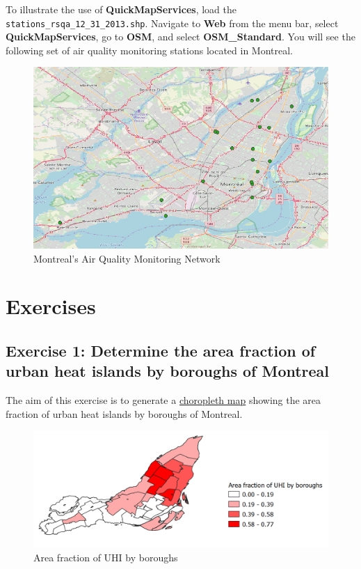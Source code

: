 \documentclass[]{book}
\theoremstyle{definition}
\theoremstyle{definition}
\theoremstyle{definition}
\theoremstyle{remark}
\begin{document}
To illustrate the use of \textbf{QuickMapServices}, load the
\texttt{stations\_rsqa\_12\_31\_2013.shp}. Navigate to \textbf{Web} from
the menu bar, select \textbf{QuickMapServices}, go to \textbf{OSM}, and
select \textbf{OSM\_Standard}. You will see the following set of air
quality monitoring stations located in Montreal.

\begin{figure}

{\centering \includegraphics[width=11.42in]{figures/BaseMaps_Example} 

}

\caption{Montreal's Air Quality Monitoring Network}\label{fig:unnamed-chunk-25}
\end{figure}

\chapter{Exercises}\label{exercises}

\section{Exercise 1: Determine the area fraction of urban heat islands
by boroughs of
Montreal}\label{exercise-1-determine-the-area-fraction-of-urban-heat-islands-by-boroughs-of-montreal}

The aim of this exercise is to generate a
\href{https://en.wikipedia.org/wiki/Choropleth_map}{choropleth map}
showing the area fraction of urban heat islands by boroughs of Montreal.

\begin{figure}

{\centering \includegraphics[width=18.1in]{figures/Choropleth_UHI} 

}

\caption{Area fraction of UHI by boroughs}\label{fig:unnamed-chunk-26}
\end{figure}
\end{document}
